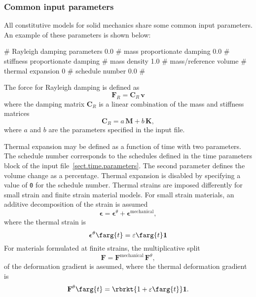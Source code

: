 \subsubsection{Common input parameters}
\label{sect.material.solid.common}
All constitutive models for solid mechanics share some common input 
parameters. An example of these parameters is shown below:
\begin{inputfile}
# Rayleigh damping parameters
0.0   # mass proportionate damping    
0.0   # stiffness proportionate damping
# mass density
1.0   # mass/reference volume
# thermal expansion
0     # schedule number
0.0   # %
\end{inputfile}

The force for Rayleigh damping is defined as
\begin{equation}
	\mathbf{F}_{R} = \mathbf{C}_{R}\,\mathbf{v}
\end{equation}
where the damping matrix $\mathbf{C}_{R}$ is a linear combination
of the mass and stiffness matrices
\begin{equation}
	\mathbf{C}_{R} = a\,\mathbf{M} + b\,\mathbf{K},
\end{equation}
where $a$ and $b$ are the parameters specified in the input file.

Thermal expansion may be defined as a function of time with 
two parameters. The schedule number 
corresponds to the schedules defined in the time parameters block of 
the input file~\ref{sect.time.parameters}. The second parameter defines the 
volume change as a percentage. Thermal expansion is disabled by 
specifying a value of \texttt{0} for the schedule number. 
Thermal strains are imposed 
differently for small strain and finite 
strain material models. For small strain materials, an additive decomposition 
of the strain is assumed
\begin{equation}
\boldsymbol{\epsilon} = 
    \boldsymbol{\epsilon}^{\theta} + 
	\boldsymbol{\epsilon}^{\mathrm{mechanical}},
\end{equation}
where the thermal strain is 
\begin{equation}
\boldsymbol{\epsilon}^{\theta}\farg{t} = \varepsilon\farg{t} \mathbf{1}
\end{equation}
For materials formulated at finite strains, the multiplicative split 
\begin{equation}
\mathbf{F} = \mathbf{F}^{\mathrm{mechanical}}\,
\mathbf{F}^{\theta},
\end{equation}
of the deformation 
gradient is assumed,
where the thermal deformation gradient is
\begin{equation}
\mathbf{F}^{\theta}\farg{t} = \rbrkt{1 + \varepsilon\farg{t}} \mathbf{1}.
\end{equation}

